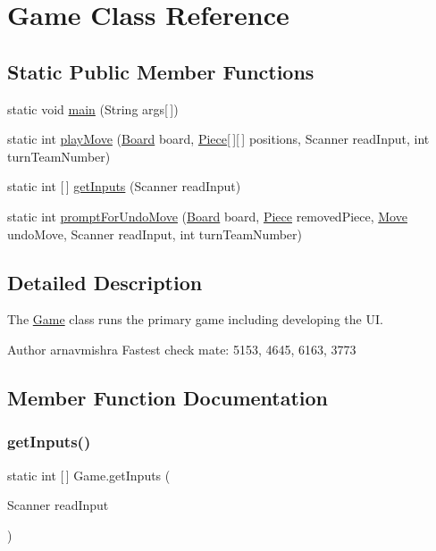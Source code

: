 \hypertarget{class_game}{}\section{Game Class Reference}
\label{class_game}
\subsection*{Static Public Member Functions}
\begin{DoxyCompactItemize}
\item 
static void \hyperlink{class_game_abe583b02e502ab32f197bb15bb73d833}{main} (String args\mbox{[}$\,$\mbox{]})
\item 
static int \hyperlink{class_game_acc3e92decaf7544e911092ae1f666b5f}{play\+Move} (\hyperlink{class_framework_1_1_board}{Board} board, \hyperlink{class_framework_1_1_pieces_1_1_piece}{Piece}\mbox{[}$\,$\mbox{]}\mbox{[}$\,$\mbox{]} positions, Scanner read\+Input, int turn\+Team\+Number)
\item 
static int \mbox{[}$\,$\mbox{]} \hyperlink{class_game_a1c07eadb9d10ca9f0f9b71f32879e21f}{get\+Inputs} (Scanner read\+Input)
\item 
static int \hyperlink{class_game_a6d1a68f89cf7dc6ad0f27bc437a34890}{prompt\+For\+Undo\+Move} (\hyperlink{class_framework_1_1_board}{Board} board, \hyperlink{class_framework_1_1_pieces_1_1_piece}{Piece} removed\+Piece, \hyperlink{class_framework_1_1_move}{Move} undo\+Move, Scanner read\+Input, int turn\+Team\+Number)
\end{DoxyCompactItemize}


\subsection{Detailed Description}
The \hyperlink{class_game}{Game} class runs the primary game including developing the UI. \begin{DoxyAuthor}{Author}
arnavmishra Fastest check mate\+: 5153, 4645, 6163, 3773 
\end{DoxyAuthor}


\subsection{Member Function Documentation}
\hypertarget{class_game_a1c07eadb9d10ca9f0f9b71f32879e21f}{}\label{class_game_a1c07eadb9d10ca9f0f9b71f32879e21f} 
\subsubsection{\texorpdfstring{get\+Inputs()}{getInputs()}}
{\footnotesize\ttfamily static int \mbox{[}$\,$\mbox{]} Game.\+get\+Inputs (\begin{DoxyParamCaption}\item[{Scanner}]{read\+Input }\end{DoxyParamCaption})\hspace{0.3cm}{\ttfamily [static]}}

